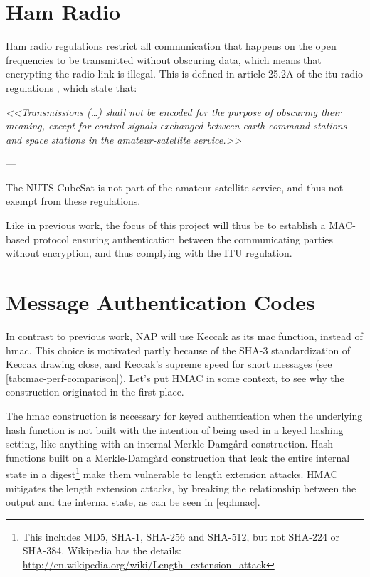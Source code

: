 \section{Ham Radio}\label{sec:ham_radio}

Ham radio regulations restrict all communication that happens on the open frequencies to be transmitted without obscuring data, which means that encrypting the radio link is illegal. This is defined in article 25.2A of the \gls{itu} radio regulations \cite{radio-regulations}, which state that:

\epigraph{\emph{<<Transmissions (\ldots) shall not be encoded for the purpose of obscuring their meaning, except for control signals exchanged between earth command stations and space stations in the amateur-satellite service.>>}}{--- \cite[p.~295]{radio-regulations}}

The NUTS CubeSat is not part of the amateur-satellite service, and thus not exempt from these regulations.

Like in previous work, the focus of this project will thus be to establish a MAC-based protocol ensuring authentication between the communicating parties without encryption, and thus complying with the ITU regulation.


\section{Message Authentication Codes}\label{sec:macs}

In contrast to previous work, NAP will use Keccak \cite{keccak} as its \gls{mac} function, instead of \gls{hmac}. This choice is motivated partly because of the SHA-3 standardization of Keccak drawing close, and Keccak's supreme speed for short messages (see \autoref{tab:mac-perf-comparison}). Let's put HMAC in some context, to see why the construction originated in the first place.

The \gls{hmac} construction is necessary for keyed authentication when the underlying hash function is not built with the intention of being used in a keyed hashing setting, like anything with an internal Merkle-Damgård \cite{merkle-damgaard} construction. Hash functions built on a Merkle-Damgård construction that leak the entire internal state in a \gls{digest}\footnote{This includes MD5, SHA-1, SHA-256 and SHA-512, but not SHA-224 or SHA-384. Wikipedia has the details: \url{http://en.wikipedia.org/wiki/Length_extension_attack}} make them vulnerable to length extension attacks. HMAC mitigates the length extension attacks, by breaking the relationship between the output and the internal state, as can be seen in \autoref{eq:hmac}.

